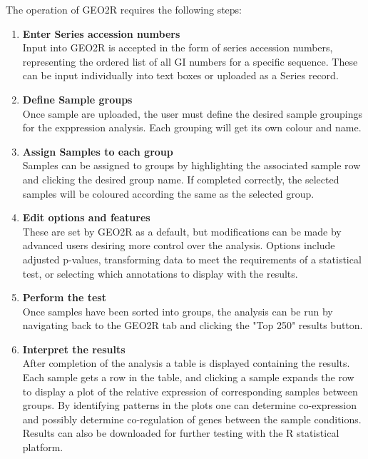     The operation of GEO2R requires the following steps:
    \begin{enumerate}
        \item \textbf{Enter Series accession numbers} \\
        Input into GEO2R is accepted in the form of series accession numbers, representing the ordered list of all GI numbers for a specific sequence.\autocite{B21} These can be input individually into text boxes or uploaded as a Series record.\autocite{B21}
        
        \item \textbf{Define Sample groups} \\
        Once sample are uploaded, the user must define the desired sample groupings for the exppression analysis.\autocite{B21} Each grouping will get its own colour and name.\autocite{B21}

        \item \textbf{Assign Samples to each group} \\
        Samples can be assigned to groups by highlighting the associated sample row and clicking the desired group name.\autocite{B21} If completed correctly, the selected samples will be coloured according the same as the selected group.\autocite{B21}

        \item \textbf{Edit options and features} \\
        These are set by GEO2R as a default, but modifications can be made by advanced users desiring more control over the analysis.\autocite{B21} Options include adjusted p-values, transforming data to meet the requirements of a statistical test, or selecting which annotations to display with the results.\autocite{B21}

        \item \textbf{Perform the test} \\
        Once samples have been sorted into groups, the analysis can be run by navigating back to the GEO2R tab and clicking the "Top 250" results button.\autocite{B21}

        \item \textbf{Interpret the results} \\
        After completion of the analysis a table is displayed containing the results.\autocite{B21} Each sample gets a row in the table, and clicking a sample expands the row to display a plot of the relative expression of corresponding samples between groups.\autocite{B21} By identifying patterns in the plots one can determine co-expression and possibly determine co-regulation of genes between the sample conditions.\autocite{B21} Results can also be downloaded for further testing with the R statistical platform.
        
    \end{enumerate}
    
